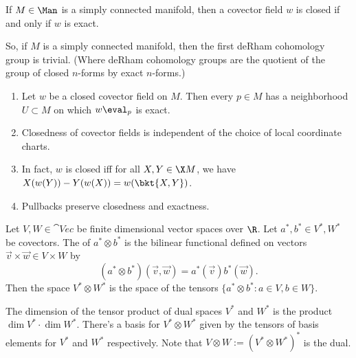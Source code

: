 \begin{lem}
    \label{lem:poincare_lemma_for_covector_fields}
    If $M \in \Man$ is a simply connected manifold, then a covector field $w$ is closed if and only if $w$ is exact.
\end{lem}

\begin{note}
    \label{rem:derham_cohomology}
    So, if $M$ is a simply connected manifold, then the first deRham cohomology group is trivial. (Where deRham cohomology groups are the quotient of the group of closed $n$-forms by exact $n$-forms.)
\end{note}

\begin{prop}
    \label{prop:closed_covector_fields}
    \hfill
    \begin{enumerate}
    \item  Let $w$ be a closed covector field on $M$. Then every $p \in M$ has a neighborhood $U \subset M$ on which $w\eval_p$ is exact.
    \item Closedness of covector fields is independent of the choice of local coordinate charts.
    \item In fact, $w$ is closed iff for all $X, Y \in \X M$, we have $X(w(Y))-Y(w(X)) = w(\bkt{X,Y})$.
    \item Pullbacks preserve closedness and exactness. 
    \end{enumerate}
\end{prop}

\begin{defn}
    \label{defn:tensor_products}
    Let $V, W \in \cat{Vec}$ be finite dimensional vector spaces over $\R$. 
    Let $a^*, b^* \in V^*, W^*$ be covectors. 
    The  of $a^* \otimes b^*$ is the bilinear functional
    defined on vectors $\vec v \times \vec w \in V \times W$ by
    \begin{equation*}
        (a^* \otimes b^*)(\vec v, \vec w) = a^*(\vec v) b^*(\vec w).
    \end{equation*}
    Then the space $V^* \otimes W^*$ is the space of the tensors $\{a^* \otimes b^* : a \in V, b \in W\}$. 
\end{defn}

\begin{prop}
    \label{prop:properties_of_the_tensor_product}
    The dimension of the tensor product of dual spaces $V^*$ and $W^*$ is the product $\dim V^* \cdot \dim W^*$. 
    There's a basis for $V^* \otimes W^*$ given by the tensors of basis elements for $V^*$ and $W^*$ respectively.
    Note that $V \otimes W := (V^* \otimes W^*)^*$ is the dual.
\end{prop}

